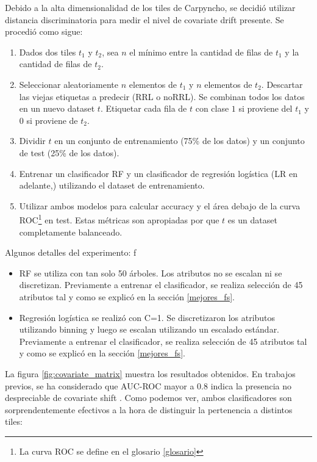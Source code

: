 Debido a la alta dimensionalidad de los tiles de Carpyncho, se decidió utilizar distancia discriminatoria para medir el nivel de covariate drift presente. Se procedió como sigue:

\begin{enumerate}
\item Dados dos tiles $t_1$ y $t_2$, sea $n$ el mínimo entre la cantidad de filas de $t_1$ y la cantidad de filas de $t_2$. 
\item Seleccionar aleatoriamente $n$ elementos de $t_1$ y $n$ elementos de $t_2$. Descartar las viejas etiquetas a predecir (RRL o noRRL). Se combinan todos los datos en un nuevo dataset $t$. Etiquetar cada fila de $t$ con clase $1$ si proviene del $t_1$ y $0$ si proviene de $t_2$. 
\item Dividir $t$ en un conjunto de entrenamiento (75\% de los datos) y un conjunto de test (25\% de los datos).
\item Entrenar un clasificador RF y un clasificador de regresión logística (LR en adelante,\cite{statisticallearning}) utilizando el dataset de entrenamiento.
\item Utilizar ambos modelos para calcular accuracy y el área debajo de la curva ROC\footnote{La curva ROC se define en el glosario \ref{glosario}} en test. Estas métricas son apropiadas por que $t$ es un dataset completamente balanceado.
\end{enumerate}

Algunos detalles del experimento:
f
\begin{itemize}
\item RF se utiliza con tan solo 50 árboles. Los atributos no se escalan ni se discretizan. Previamente a entrenar el clasificador, se realiza selección de 45 atributos tal y como se explicó en la sección \ref{mejores_fs}.
\item Regresión logística se realizó con C=1. Se discretizaron los atributos utilizando binning y luego se escalan utilizando un escalado estándar. Previamente a entrenar el clasificador, se realiza selección de 45 atributos tal y como se explicó en la sección \ref{mejores_fs}.
\end{itemize}

La figura \ref{fig:covariate_matrix} muestra los resultados obtenidos. En trabajos previos, se ha considerado que AUC-ROC mayor a 0.8 indica la presencia no despreciable de covariate shift \cite{GeetaDharani2019CovariateSA}. Como podemos ver, ambos clasificadores son sorprendentemente efectivos a la hora de distinguir la pertenencia a distintos tiles:

